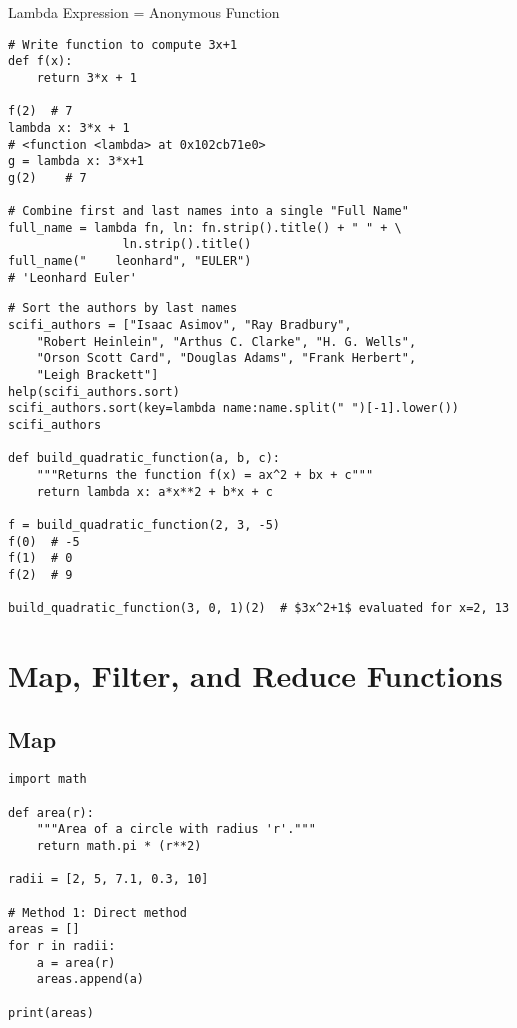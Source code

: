 \documentclass{beamer}
\begin{document}
\begin{frame}[fragile]{Lambda Expression = Anonymous Function}
\begin{verbatim}
# Write function to compute 3x+1
def f(x):
    return 3*x + 1

f(2)  # 7
lambda x: 3*x + 1
# <function <lambda> at 0x102cb71e0>
g = lambda x: 3*x+1
g(2)    # 7

# Combine first and last names into a single "Full Name"
full_name = lambda fn, ln: fn.strip().title() + " " + \
                ln.strip().title()
full_name("    leonhard", "EULER")
# 'Leonhard Euler'
\end{verbatim}
\end{frame}

\begin{frame}[fragile]
\begin{verbatim}
# Sort the authors by last names
scifi_authors = ["Isaac Asimov", "Ray Bradbury", 
    "Robert Heinlein", "Arthus C. Clarke", "H. G. Wells", 
    "Orson Scott Card", "Douglas Adams", "Frank Herbert",
    "Leigh Brackett"]
help(scifi_authors.sort)
scifi_authors.sort(key=lambda name:name.split(" ")[-1].lower())
scifi_authors

def build_quadratic_function(a, b, c):
    """Returns the function f(x) = ax^2 + bx + c"""
    return lambda x: a*x**2 + b*x + c

f = build_quadratic_function(2, 3, -5)
f(0)  # -5
f(1)  # 0
f(2)  # 9

build_quadratic_function(3, 0, 1)(2)  # $3x^2+1$ evaluated for x=2, 13
\end{verbatim}
\end{frame}

\section{Map, Filter, and Reduce Functions}
\subsection{Map}

\begin{frame}[fragile]
\begin{verbatim}
import math

def area(r):
    """Area of a circle with radius 'r'."""
    return math.pi * (r**2)

radii = [2, 5, 7.1, 0.3, 10]

# Method 1: Direct method
areas = []
for r in radii:
    a = area(r)
    areas.append(a)

print(areas)
\end{verbatim}
\end{frame}
\end{document}
